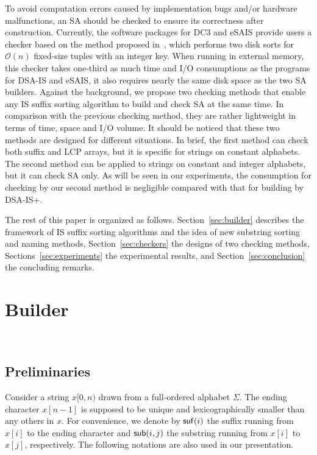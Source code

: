 \documentclass[10pt,journal,compsoc]{IEEEtran}
\begin{document}
To avoid computation errors caused by implementation bugs and/or hardware malfunctions, an SA should be checked to ensure its correctness after construction. Currently, the software packages for DC3 and eSAIS provide users a checker based on the method proposed in~\cite{Dementiev2008a}, which performs two disk sorts for $\mathcal{O}(n)$ fixed-size tuples with an integer key. When running in external memory, this checker takes one-third as much time and I/O consumptions as the programs for DSA-IS and eSAIS, it also requires nearly the same disk space as the two SA builders. Against the background, we propose two checking methods that enable any IS suffix sorting algorithm to build and check SA at the same time. In comparison with the previous checking method, they are rather lightweight in terms of time, space and I/O volume. It should be noticed that these two methods are designed for different situations. In brief, the first method can check both suffix and LCP arrays, but it is specific for strings on constant alphabets. The second method can be applied to strings on constant and integer alphabets, but it can check SA only. As will be seen in our experiments, the consumption for checking by our second method is negligible compared with that for building by DSA-IS+.

The rest of this paper is organized as follows. Section~\ref{sec:builder} describes the framework of IS suffix sorting algorithms and the idea of new substring sorting and naming methods, Section~\ref{sec:checkers} the designs of two checking methods, Sections~\ref{sec:experiments} the experimental results, and Section~\ref{sec:conclusion} the concluding remarks.

\section{Builder}~\label{sec:builder}

\subsection{Preliminaries}

Consider a string $x[0,n)$ drawn from a full-ordered alphabet $\Sigma$. The ending character $x[n - 1]$ is supposed to be unique and lexicographically smaller than any others in $x$. For convenience, we denote by ${\sf suf}(i)$ the suffix running from $x[i]$ to the ending character and ${\sf sub}(i,j)$ the substring running from $x[i]$ to $x[j]$, respectively. The following notations are also used in our presentation.
\end{document}
